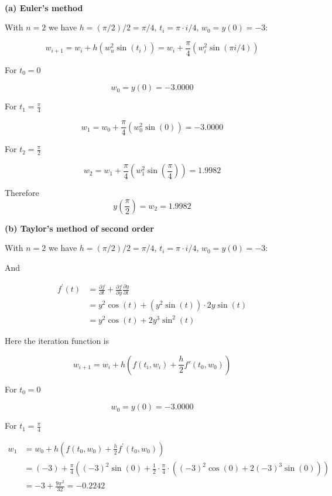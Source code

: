 \begin{solution}\ \\


\textbf{(a) Euler's method}



With $n=2$ we have $h=(\pi/2)/2=\pi/4$, $t_i=\pi \cdot i /4$, $w_0=y(0)=-3$:


$$
w_{i+1}=w_i+h(w_u^2 \sin(t_i))=w_i+\frac{\pi}{4}(w_i^2 \sin(\pi i /4))
$$


For $t_0=0$

$$
w_0=y(0)=-3.0000
$$

For $t_1=\frac{\pi}{4}$


$$
w_1=w_0+\frac{\pi}{4} \left( w_0^2 \sin(0) \right)=-3.0000
$$


For $t_2=\frac{\pi}{2}$


$$
w_2=w_1+\frac{\pi}{4} \left( w_1^2 \sin(\frac{\pi}{4}) \right)=1.9982
$$


Therefore 
$$
y(\frac{\pi}{2})=w_2=1.9982
$$


\dotfill

\textbf{(b) Taylor's method of second order}



With $n=2$ we have $h=(\pi/2)/2=\pi/4$, $t_i=\pi \cdot i /4$, $w_0=y(0)=-3$:

And

$$
\begin{aligned}
f^{\prime}(t) &=\frac{\partial f}{\partial t}+\frac{\partial f}{\partial y} \frac{\partial y}{\partial t} \\
&=y^{2} \cos (t)+\left(y^{2} \sin (t)\right) \cdot 2 y \sin (t) \\
&=y^{2} \cos (t)+2 y^{3} \sin ^{2}(t)
\end{aligned}
$$


Here the iteration function is

$$
w_{i+1}=w_i+h \left(  f(t_i,w_i)+ \frac{h}{2} f'(t_0,w_0)   \right)
$$


For $t_0=0$

$$
w_0=y(0)=-3.0000
$$

For $t_1=\frac{\pi}{4}$


$$
\begin{aligned}
w_{1} &=w_{0}+h\left(f\left(t_{0}, w_{0}\right)+\frac{h}{2} f^{\prime}\left(t_{0}, w_{0}\right)\right) \\
&=(-3)+\frac{\pi}{4}\left((-3)^{2} \sin (0)+\frac{1}{2} \cdot \frac{\pi}{4} \cdot\left((-3)^{2} \cos (0)+2(-3)^{3} \sin (0)\right)\right)\\
&=-3+\frac{9 \pi^{2}}{32}=-0.2242
\end{aligned}
$$



\end{solution}
